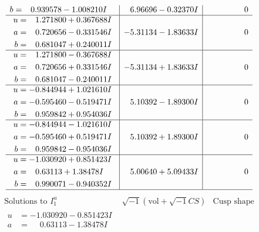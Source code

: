 \documentclass[1p]{elsarticle_modified}
\theoremstyle{definition}
\newcommand{\I}{\sqrt{-1}}
\begin{document}
$$\begin{array}{c|c|c}
\begin{aligned}
b &= \phantom{-}0.939578 - 1.008210 I\end{aligned}
 & \phantom{-}6.96696 - 0.32370 I & \phantom{-0.000000 } 0 \\ \hline\begin{aligned}
u &= \phantom{-}1.271800 + 0.367688 I \\
a &= \phantom{-}0.720656 - 0.331546 I \\
b &= \phantom{-}0.681047 + 0.240011 I\end{aligned}
 & -5.31134 - 1.83633 I & \phantom{-0.000000 } 0 \\ \hline\begin{aligned}
u &= \phantom{-}1.271800 - 0.367688 I \\
a &= \phantom{-}0.720656 + 0.331546 I \\
b &= \phantom{-}0.681047 - 0.240011 I\end{aligned}
 & -5.31134 + 1.83633 I & \phantom{-0.000000 } 0 \\ \hline\begin{aligned}
u &= -0.844944 + 1.021610 I \\
a &= -0.595460 - 0.519471 I \\
b &= \phantom{-}0.959842 + 0.954036 I\end{aligned}
 & \phantom{-}5.10392 - 1.89300 I & \phantom{-0.000000 } 0 \\ \hline\begin{aligned}
u &= -0.844944 - 1.021610 I \\
a &= -0.595460 + 0.519471 I \\
b &= \phantom{-}0.959842 - 0.954036 I\end{aligned}
 & \phantom{-}5.10392 + 1.89300 I & \phantom{-0.000000 } 0 \\ \hline\begin{aligned}
u &= -1.030920 + 0.851423 I \\
a &= \phantom{-}0.63113 + 1.38478 I \\
b &= \phantom{-}0.990071 - 0.940352 I\end{aligned}
 & \phantom{-}5.00640 + 5.09433 I & \phantom{-0.000000 } 0\\
 \hline 
 \end{array}$$\newpage$$\begin{array}{c|c|c}  
\text{Solutions to }I^u_{1}& \I (\text{vol} + \sqrt{-1}CS) & \text{Cusp shape}\\
 \hline 
\begin{aligned}
u &= -1.030920 - 0.851423 I \\
a &= \phantom{-}0.63113 - 1.38478 I \\

\end{aligned}
\end{array}$$
\end{document}
